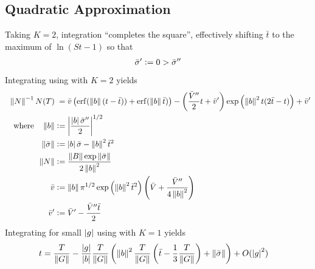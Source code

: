 \documentclass[a4paper]{base}
\begin{document}
\subsection{Quadratic Approximation}\label{sec:Quad}
    Taking $K=2$, integration ``completes the square'', effectively shifting $\bar{t}$ to the maximum of $\ln (S{t}-1)$ so that
    \begin{equation} \label{sol:Quad:N}
        \begin{aligned}
           \bar{\sigma}^{\prime} \mathrel{\mathop:}= 0 > \bar{\sigma}^{\prime\prime}
        \end{aligned}
    \end{equation}
    Integrating  using  with $K=2$ yields
    \begin{equation} \label{sol:Quad:N}
        \begin{aligned}
            \norm{N}^{-1} N(T) &\phantom{:}= \bar{v} \left(\erf(\norm{b}(t-\bar{t}))+\erf(\norm{b}\bar{t})\right)  
             - \left(\frac{\bar{V}^{\prime\prime}}{2}t + \bar{v}^{\prime}\right) \exp\left(\norm{b}^{2}t(2\bar{t}-t)\right)
            + \bar{v}^{\prime} \\
            \QT{where}\norm{b} &\deq \mds{\frac{\mds{b}\bar{\sigma}^{\prime\prime}}{2}}^{1/2} \\
            \norm{\bar{\sigma}} &\deq \mds{b}\bar{\sigma}-\norm{b}^2 \bar{t}^2 \\
            \norm{N} &\deq \frac{\norm{B}\exp \norm{\bar{\sigma}}} {2\norm{b}^{2}}  \\
            \bar{v} &\deq \norm{b} \pi^{1/2} \exp \left(\norm{b}^{2}\bar{t}^{2}\right) \left(\bar{V} + \frac{\bar{V}^{\prime\prime}}{4\norm{b}^{2}}\right) \\
            \bar{v}^{\prime} &\deq \bar{V}^{\prime} - \frac{\bar{V}^{\prime\prime}\bar{t}}{2}\\
        \end{aligned}
    \end{equation}
    Integrating  for small $\left\lvert{g}\right\rvert$ using  with $K=1$ yields
    \begin{equation} \label{sol:Quad:t}
        \begin{aligned}
            t &= \frac{T}{\left\lVert{G}\right\rVert} - \frac{\left\lvert{g}\right\rvert}{\left\lvert{b}\right\rvert}\frac{T}{\left\lVert{G}\right\rVert} 
            \left(\left\lVert{b}\right\rVert^{2} \frac{T}{\left\lVert{G}\right\rVert} \left(\bar{t}-\frac{1}{3}\frac{T}{\left\lVert{G}\right\rVert}\right) + \left\lVert{\bar{\sigma}}\right\rVert\right) + O(\left\lvert{g}\right\rvert^{2})
        \end{aligned}
    \end{equation}



 

\end{document}
